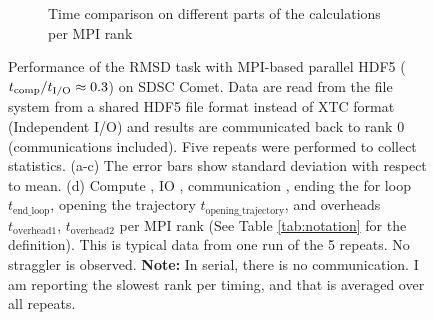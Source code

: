 \begin{figure}[ht!]
\begin{subfigure} {.5\textwidth}
  \caption{Time comparison on different parts of the calculations per MPI rank}
  \label{fig:MPIranks-hdf5}
\end{subfigure}
%
\caption{Performance of the RMSD task with MPI-based parallel HDF5 (${t}_{\text{comp}}/{t}_{\text{I/O}} \approx 0.3$) on SDSC Comet.
Data are read from the file system from a shared HDF5 file format instead of XTC format (Independent I/O) and results are communicated back to rank 0 (communications included). 
Five repeats were performed to collect statistics. (a-c) The error bars show standard deviation with respect to mean. (d) Compute \tcomp, IO \tIO, communication \tcomm, ending the for loop $t_{\text{end\_loop}}$,
  opening the trajectory $t_{\text{opening\_trajectory}}$, and overheads $t_{\text{overhead1}}$, $t_{\text{overhead2}}$ per MPI rank (See Table \ref{tab:notation} for the definition).
  This is typical data from one run of the 5 repeats. No straggler is observed. \textbf{Note:} In serial, there is no communication. I am reporting the slowest rank per timing, and that is averaged over all repeats.}
\label{fig:MPIwithIO-hdf5}
\end{figure}



